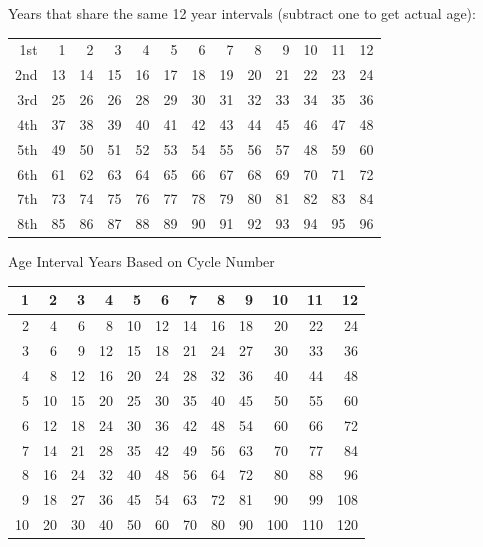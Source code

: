 \begin{mdframed}[backgroundcolor=cyan!5]
\fontsize{7}{7}\selectfont
Years that share the same 12 year intervals (subtract one to get actual age):
\vspace{-1em}
\begin{longtable}[c]{r|rrrrrrrrrrrr}
\hline
1st 	& 1	& 2	& 3	& 4	& 5	& 6 
		& 7	& 8	& 9	& 10	& 11	& 12 \\
2nd	& 13 & 14 & 15 & 16 & 17 & 18 
		& 19 & 20 & 21 & 22 & 23 & 24 \\
\rowcolor{red!10}3rd	& 25 & 26 & 26 & 28 & 29 & 30 
		& 31 & 32 & 33 & 34 & 35 & 36 \\ 
4th	& 37 & 38 & 39 & 40 & 41 & 42
		& 43 & 44 & 45 & 46 & 47 & 48 \\
5th 	& 49 & 50 & 51 & 52 & 53 & 54
		& 55 & 56 & 57 & 48 & 59 & 60 \\ 
6th	& 61 & 62 & 63 & 64 & 65 & 66 
		& 67 & 68 & 69 & 70 & 71 & 72 \\ 
7th	& 73 & 74 & 75 & 76 & 77 & 78
		& 79 & 80 & 81 & 82 & 83 & 84 \\
8th  & 85 & 86 & 87 & 88 & 89 & 90
		& 91 & 92 & 93 & 94 & 95 & 96 \\ \hline
\end{longtable}

Age Interval Years Based on Cycle Number
\vspace{-1em}
\begin{longtable}[c]{r|rrrrrrrrrrr}
\hline
1	& 2	& 3	& 4	& 5	& 6 	& 7	& 8	& 9	& 10	
	& \cellcolor{red!10}11	& 12 \\ \hline
2  & 4   	& 6 	& 8 	& 10 	& 12 	& 14 	& 16 	& 18 	& 20 	& 22 	& 24 \\
\rowcolor{red!10}3	& 6	& 9	& 12	& 15	& 18	& 21	& 24	
	& 27	& \cellcolor{yellow!20} 30	& \cellcolor{yellow!20} 33	& 36 \\
4	& 8	& 12	& 16	& 20	& 24	& 28	& 32	& 36	& 40	& 44	& 48 \\
5	& 10	& 15	& 20	& 25	& 30	& 35	& 40	& 45	& 50	& 55	& 60 \\
6	& 12	& 18	& 24	& 30	& 36	& 42	& 48	& 54	& 60	& 66	& 72 \\
7	& 14	& 21	& 28	& 35	& 42	& 49	& 56	& 63	& 70	& 77	& 84 \\
8	& 16	& 24	& 32	& 40	& 48	& 56	& 64	& 72	& 80	& 88	& 96 \\
9	& 18	& 27	& 36	& 45	& 54	& 63	& 72	& 81	& 90	& 99	& 108 \\
10 & 20 & 30 & 40 & 50 & 60 & 70 & 80 & 90 & 100 & 110 & 120 \\

\end{longtable}
\end{mdframed}
